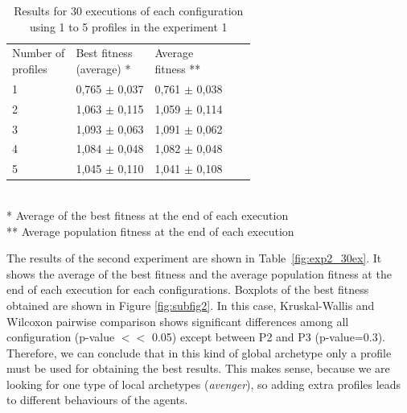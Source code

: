 \documentclass{sig-alternate}
\begin{document}
\begin{table}
\begin{center}
\caption{Results for 30 executions of each configuration using 1 to 5 profiles in the experiment 1}
\label{fig:exp1_30ex}

\begin{tabular}{lllll}
\hline\noalign{\smallskip}
\parbox[t]{1.5cm}{Number of\\ profiles}
& \parbox[t]{2cm}{Best fitness\\ (average) *}
& \parbox[t]{2cm}{Average\\ fitness **} \\
\noalign{\smallskip}
\hline
\noalign{\smallskip}
1 & 0,765 $\pm$ 0,037 & 0,761 $\pm$ 0,038 \\
2 & 1,063 $\pm$ 0,115 & 1,059 $\pm$ 0,114 \\
3 & 1,093 $\pm$ 0,063 & 1,091 $\pm$ 0,062 \\
4 & 1,084 $\pm$ 0,048 & 1,082 $\pm$ 0,048 \\
5 & 1,045 $\pm$ 0,110 & 1,041 $\pm$ 0,108 \\
\hline
\end{tabular}
\\
\** Average of the best fitness at the end of each execution\\
\*** Average population fitness  at the end of each execution \\
\end{center}
\end{table}



The results of the second experiment are shown in
Table~\ref{fig:exp2_30ex}. It shows the average of the best fitness
and the average population fitness at the end of each execution for
each configurations. Boxplots of the best fitness obtained are shown
in Figure \ref{fig:subfig2}. In this case, Kruskal-Wallis and Wilcoxon
pairwise comparison shows significant differences among all
configuration (p-value $<<$ 0.05) except between P2 and P3
(p-value=0.3). Therefore, we can conclude that in this kind of global
archetype only a profile must be used for obtaining the best
results. This makes sense, because we are looking for one type of
local archetypes ({\em avenger}), so adding extra profiles leads to
different behaviours of the agents. 
\end{document}
